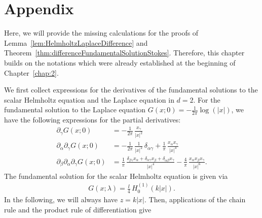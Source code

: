 \chapter*{Appendix}
\label{chap:app}

Here, we will provide the missing calculations for the proofs of Lemma~\ref{lem:HelmholtzLaplaceDifference} and Theorem~\ref{thm:differenceFundamentalSolutionStokes}.
Therefore, this chapter builds on the notations which were already established at the beginning of Chapter~\ref{chap:2}.

We first collect expressions for the derivatives of the fundamental solutions to the scalar Helmholtz equation and the Laplace equation in $d= 2$.
For the fundamental solution to the Laplace equation $G(x; 0) = -\frac{1}{2\pi} \log(|x|)$, we have the following expressions for the partial derivatives:
\begin{align*}
  \partial_\gamma G(x; 0) &= -\frac{1}{2\pi} \, \frac{x_\gamma}{|x|^2} \\[0.5em]
  \partial_\alpha \partial_\gamma G(x; 0) &= -\frac{1}{2\pi}\, \frac{1}{|x|^2}\,\delta_{\alpha\gamma} + \frac{1}{\pi} \, \frac{x_\alpha x_\gamma}{|x|^4} \\[0.5em]
  \partial_\beta \partial_\alpha \partial_\gamma G(x; 0)
  &= \frac{1}{\pi} \, \frac{\delta_{\beta \gamma} x_\alpha + \delta_{\alpha \gamma} x_\beta + \delta_{\alpha\beta} x_\gamma}{|x|^4} - \frac{4}{\pi}\, \frac{x_\alpha x_\beta x_\gamma}{|x|^6}.
\end{align*}
The fundamental solution for the scalar Helmholtz equation is given via 
\begin{align*}
  G(x; \lambda) = \frac{\ii}{4}\, H_0^{(1)}(k|x|).
\end{align*}
In the following, we will always have $z =  k|x|$.  
Then, applications of the chain rule and the product rule of differentiation give
